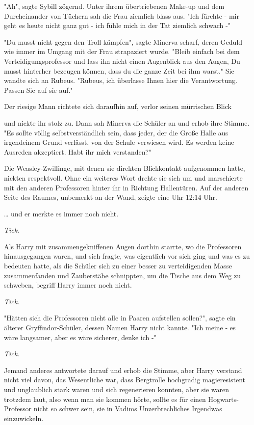 {"Ah", sagte Sybill zögernd. Unter ihrem übertriebenen Make-up und dem Durcheinander von Tüchern sah die Frau ziemlich blass aus. "Ich fürchte - mir geht es heute nicht ganz gut - ich fühle mich in der Tat ziemlich schwach -"

"Du musst nicht gegen den Troll kämpfen", sagte Minerva scharf, deren Geduld wie immer im Umgang mit der Frau strapaziert wurde. "Bleib einfach bei dem Verteidigungsprofessor und lass ihn nicht einen Augenblick aus den Augen, Du musst hinterher bezeugen können, dass du die ganze Zeit bei ihm warst." Sie wandte sich an Rubeus. "Rubeus, ich überlasse Ihnen hier die Verantwortung. Passen Sie auf sie auf."

Der riesige Mann richtete sich daraufhin auf, verlor seinen mürrischen Blick

und nickte ihr stolz zu. Dann sah Minerva die Schüler an und erhob ihre Stimme. "Es sollte völlig selbstverständlich sein, dass jeder, der die Große Halle aus irgendeinem Grund verlässt, von der Schule verwiesen wird. Es werden keine Ausreden akzeptiert. Habt ihr mich verstanden?"

Die Weasley-Zwillinge, mit denen sie direkten Blickkontakt aufgenommen hatte, nickten respektvoll. Ohne ein weiteres Wort drehte sie sich um und marschierte mit den anderen Professoren hinter ihr in Richtung Hallentüren. Auf der anderen Seite des Raumes, unbemerkt an der Wand, zeigte eine Uhr 12:14 Uhr.

… und er merkte es immer noch nicht.

\emph{Tick}.

Als Harry mit zusammengekniffenen Augen dorthin starrte, wo die Professoren hinausgegangen waren, und sich fragte, was eigentlich vor sich ging und was es zu bedeuten hatte, als die Schüler sich zu einer besser zu verteidigenden Masse zusammenfanden und Zauberstäbe schnippten, um die Tische aus dem Weg zu schweben, begriff Harry immer noch nicht.

\emph{Tick}.

"Hätten sich die Professoren nicht alle in Paaren aufstellen sollen?", sagte ein älterer Gryffindor-Schüler, dessen Namen Harry nicht kannte. "Ich meine - es wäre langsamer, aber es wäre sicherer, denke ich -"

\emph{Tick}.

Jemand anderes antwortete darauf und erhob die Stimme, aber Harry verstand nicht viel davon, das Wesentliche war, dass Bergtrolle hochgradig magieresistent und unglaublich stark waren und sich regenerieren konnten, aber sie waren trotzdem laut, also wenn man sie kommen hörte, sollte es für einen Hogwarts-Professor nicht so schwer sein, sie in Vadims Unzerbrechliches Irgendwas einzuwickeln.

}
